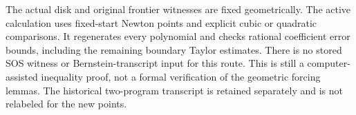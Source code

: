 The actual disk and original frontier witnesses are fixed geometrically.
The active calculation uses fixed-start Newton points and explicit cubic or
quadratic comparisons. It regenerates every polynomial and checks rational
coefficient error bounds, including the remaining boundary Taylor estimates.
There is no stored SOS witness or Bernstein-transcript input for this route.
This is still a computer-assisted inequality proof, not a formal verification
of the geometric forcing lemmas. The historical two-program transcript is
retained separately and is not relabeled for the new points.
